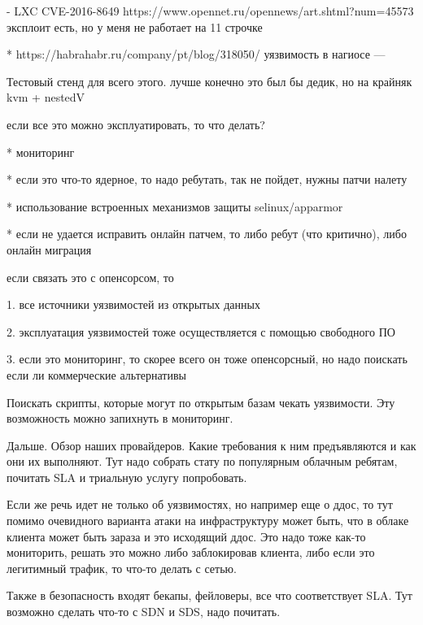 - LXC CVE-2016-8649 https://www.opennet.ru/opennews/art.shtml?num=45573
эксплоит есть, но у меня не работает на 11 строчке

* https://habrahabr.ru/company/pt/blog/318050/ уязвимость в нагиосе
---

Тестовый стенд для всего этого.
лучше конечно это был бы дедик, но на крайняк kvm + nestedV

если все это можно эксплуатировать, то что делать?

* мониторинг

* если это что-то ядерное, то надо ребутать, так не пойдет, нужны патчи налету

* использование встроенных механизмов защиты selinux/apparmor

* если не удается исправить онлайн патчем, то либо ребут (что критично), либо онлайн миграция


если связать это с опенсорсом, то

1. все источники уязвимостей из открытых данных

2. эксплуатация уязвимостей тоже осуществляется с помощью свободного ПО

3. если это мониторинг, то скорее всего он тоже опенсорсный, но надо поискать если ли коммерческие альтернативы

Поискать скрипты, которые могут по открытым базам чекать уязвимости.
Эту возможность можно запихнуть в мониторинг.


Дальше.
Обзор наших провайдеров.
Какие требования к ним предъявляются и как они их выполняют.
Тут надо собрать стату по популярным облачным ребятам, почитать SLA и триальную услугу попробовать.

Если же речь идет не только об уязвимостях, но например еще о ддос, то тут помимо очевидного варианта атаки на инфраструктуру может быть, что в облаке клиента может быть зараза и это исходящий ддос.
Это надо тоже как-то мониторить, решать это можно либо заблокировав клиента, либо если это легитимный трафик, то что-то делать с сетью.

Также в безопасность входят бекапы, фейловеры, все что соответствует SLA.
Тут возможно сделать что-то с SDN и SDS, надо почитать.


